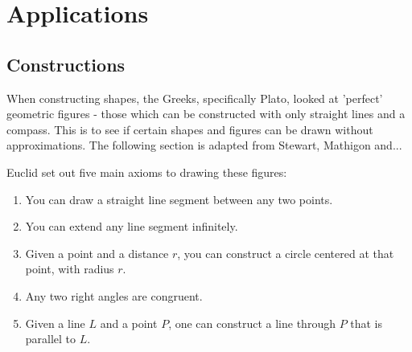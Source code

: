 \section{Applications} \label{sec:applications}

\subsection{Constructions}
When constructing shapes, the Greeks, specifically Plato, looked at 'perfect' geometric figures - those which can be constructed with only straight lines and a compass. This is to see if certain shapes and figures can be drawn without approximations. The following section is adapted from Stewart, Mathigon and...

Euclid set out five main axioms to drawing these figures:

\begin{enumerate}
    \item You can draw a straight line segment between any two points.
    \item You can extend any line segment infinitely.
    \item Given a point and a distance $r$, you can construct a circle centered at that point, with radius $r$.
    \item Any two right angles are congruent.
    \item Given a line $L$ and a point $P$, one can construct a line through $P$ that is parallel to $L$. 
\end{enumerate}

